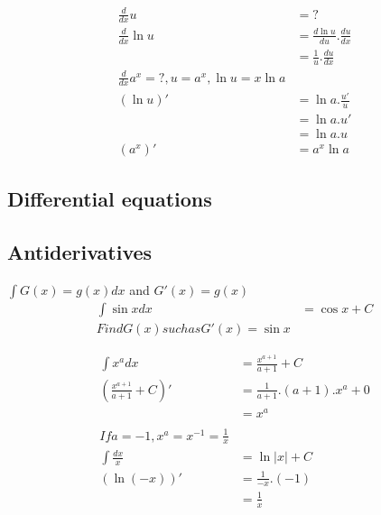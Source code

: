\documentclass{article}
\begin{document}
                    \begin{align*}
                        \frac{d}{dx} u &= ?\\
                        \frac{d}{dx} \ln u &= \frac{d \ln u}{du} . \frac{du}{dx} \\
                        &= \frac{1}{u}.\frac{du}{dx}\\
                        \frac{d}{dx} a^x = ? , u = a^x , \ln u = x\ln a \\
                        (\ln u)' &= \ln a. \frac{u'}{u}\\
                        &= \ln a . u'\\
                        &= \ln a .u \\
                        (a^x)' &= a^x \ln a
                    \end{align*}

        \subsection{Differential equations}

            \subsection{Antiderivatives}
            \label{sub:Antiderivatives}

            $\int G(x)= g(x)dx $ and $G'(x)=g(x)$\\

            \begin{align*}
                \int \sin x dx &= \cos x + C\\
                Find G(x) such as G'(x)= \sin x
            \end{align*}

            \begin{align*}
                \int x^a dx &= \frac{x^{a+1}}{a+1}+C\\
                (\frac{x^{a+1}}{a+1}+C)' &= \frac{1}{a+1}.(a+1).x^a + 0\\
                &= x^a\\
                ~\\
                If a = -1, x^a = x^{-1} = \frac{1}{x}\\
                \int \frac{dx}{x} &= \ln |x| + C\\
                (\ln(-x))' &= \frac{1}{-x}.(-1)\\
                &= \frac{1}{x}
            \end{align*}
\end{document}
